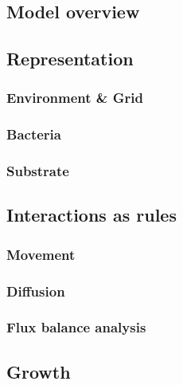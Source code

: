 \subsection{Model overview}

\subsection{Representation}
\subsubsection{Environment \& Grid}
\subsubsection{Bacteria}
\subsubsection{Substrate}

\subsection{Interactions as rules}
\subsubsection{Movement}
\subsubsection{Diffusion}
\subsubsection{Flux balance analysis}

\subsection{Growth}
